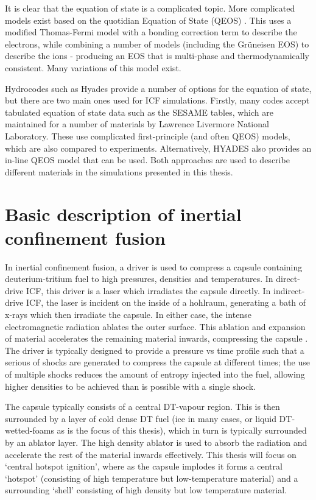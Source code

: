 It is clear that the equation of state is a complicated topic. More complicated models exist based on the quotidian Equation of State (QEOS) \cite{More1988}. This uses a modified Thomas-Fermi model with a bonding correction term to describe the electrons, while combining a number of models (including the Gr{\"u}neisen EOS) to describe the ions - producing an EOS that is multi-phase and thermodynamically consistent. Many variations of this model exist. 

Hydrocodes such as Hyades provide a number of options for the equation of state, but there are two main ones used for ICF simulations. Firstly, many codes accept tabulated equation of state data such as the SESAME tables, which are maintained for a number of materials by Lawrence Livermore National Laboratory. These use complicated first-principle (and often QEOS) models, which are also compared to experiments. Alternatively, HYADES also provides an in-line QEOS model that can be used. Both approaches are used to describe different materials in the simulations presented in this thesis.

\section{Basic description of inertial confinement fusion}

In inertial confinement fusion, a driver is used to compress a capsule containing deuterium-tritium fuel to high pressures, densities and temperatures. In direct-drive ICF, this driver is a laser which irradiates the capsule directly. In indirect-drive ICF, the laser is incident on the inside of a hohlraum, generating a bath of x-rays which then irradiate the capsule. In either case, the intense electromagnetic radiation ablates the outer surface. This ablation and expansion of material accelerates the remaining material inwards, compressing the capsule \cite{Atzeni2008}. The driver is typically designed to provide a pressure vs time profile such that a serious of shocks are generated to compress the capsule at different times; the use of multiple shocks reduces the amount of entropy injected into the fuel, allowing higher densities to be achieved than is possible with a single shock.

The capsule typically consists of a central DT-vapour region. This is then surrounded by a layer of cold dense DT fuel (ice in many cases, or liquid DT-wetted-foams as is the focus of this thesis), which in turn is typically surrounded by an ablator layer. The high density ablator is used to absorb the radiation and accelerate the rest of the material inwards effectively. This thesis will focus on `central hotspot ignition', where as the capsule implodes it forms a central `hotspot' (consisting of high temperature but low-temperature material) and a surrounding `shell' consisting of high density but low temperature material.

